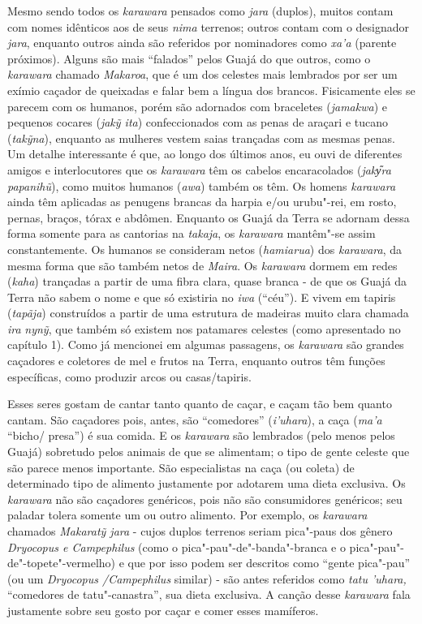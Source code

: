 Mesmo sendo todos os \emph{karawara} pensados como \emph{jara} (duplos),
muitos contam com nomes idênticos aos de seus \emph{nima} terrenos;
outros contam com o designador \emph{jara}, enquanto outros ainda são
referidos por nominadores como \emph{xa'a} (parente próximos). Alguns
são mais ``falados'' pelos Guajá do que outros, como o \emph{karawara}
chamado \emph{Makaroa}, que é um dos celestes mais lembrados por ser um
exímio caçador de queixadas e falar bem a língua dos brancos.
Fisicamente eles se parecem com os humanos, porém são adornados com
braceletes (\emph{jamakwa}) e pequenos cocares (\emph{jakỹ ita})
confeccionados com as penas de araçari e tucano (\emph{takỹna}),
enquanto as mulheres vestem saias trançadas com as mesmas penas. Um
detalhe interessante é que, ao longo dos últimos anos, eu ouvi de
diferentes amigos e interlocutores que os \emph{karawara} têm os cabelos
encaracolados (\emph{jaky᷉ra papanihũ}), como muitos humanos
(\emph{awa}) também os têm. Os homens \emph{karawara} ainda têm
aplicadas as penugens brancas da harpia e/ou urubu"-rei, em rosto,
pernas, braços, tórax e abdômen. Enquanto os Guajá da Terra se adornam
dessa forma somente para as cantorias na \emph{takaja}, os
\emph{karawara} mantêm"-se assim constantemente. Os humanos se consideram
netos (\emph{hamiarua}) dos \emph{karawara}, da mesma forma que são
também netos de \emph{Maira}. Os \emph{karawara} dormem em redes
(\emph{kaha}) trançadas a partir de uma fibra clara, quase branca - de
que os Guajá da Terra não sabem o nome e que só existiria no \emph{iwa}
(``céu''). E vivem em tapiris (\emph{tapãja}) construídos a partir de
uma estrutura de madeiras muito clara chamada \emph{ira} \emph{nynỹ},
que também só existem nos patamares celestes (como apresentado no
capítulo 1). Como já mencionei em algumas passagens, os \emph{karawara}
são grandes caçadores e coletores de mel e frutos na Terra, enquanto
outros têm funções específicas, como produzir arcos ou casas/tapiris.

Esses seres gostam de cantar tanto quanto de caçar, e caçam tão bem
quanto cantam. São caçadores pois, antes, são ``comedores''
(\emph{i'uhara}), a caça (\emph{ma'a} ``bicho/ presa'') é sua comida. E
os \emph{karawara} são lembrados (pelo menos pelos Guajá) sobretudo
pelos animais de que se alimentam; o tipo de gente celeste que são
parece menos importante. São especialistas na caça (ou coleta) de
determinado tipo de alimento justamente por adotarem uma dieta
exclusiva. Os \emph{karawara} não são caçadores genéricos, pois não são
consumidores genéricos; seu paladar tolera somente um ou outro alimento.
Por exemplo, os \emph{karawara} chamados \emph{Makaratỹ jara} - cujos
duplos terrenos seriam pica"-paus dos gênero \emph{Dryocopus e
Campephilus} (como o pica"-pau"-de"-banda"-branca e o
pica"-pau"-de"-topete"-vermelho) e que por isso podem ser descritos como
``gente pica"-pau'' (ou um \emph{Dryocopus /Campephilus} similar) - são
antes referidos como \emph{tatu 'uhara,} ``comedores de tatu"-canastra'',
sua dieta exclusiva. A canção desse \emph{karawara} fala justamente
sobre seu gosto por caçar e comer esses mamíferos.

